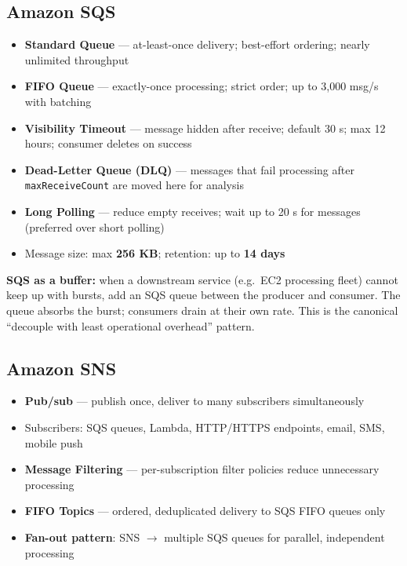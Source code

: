 \subsection{Amazon SQS}

\begin{keyfacts}
\begin{itemize}
  \item \textbf{Standard Queue} --- at-least-once delivery; best-effort ordering; nearly unlimited throughput
  \item \textbf{FIFO Queue} --- exactly-once processing; strict order; up to 3,000 msg/s with batching
  \item \textbf{Visibility Timeout} --- message hidden after receive; default 30 s; max 12 hours; consumer deletes on success
  \item \textbf{Dead-Letter Queue (DLQ)} --- messages that fail processing after \texttt{maxReceiveCount} are moved here for analysis
  \item \textbf{Long Polling} --- reduce empty receives; wait up to 20 s for messages (preferred over short polling)
  \item Message size: max \textbf{256 KB}; retention: up to \textbf{14 days}
\end{itemize}
\end{keyfacts}

\begin{examtip}
\textbf{SQS as a buffer:} when a downstream service (e.g.\ EC2 processing fleet) cannot keep up with bursts, add an SQS queue between the producer and consumer. The queue absorbs the burst; consumers drain at their own rate. This is the canonical ``decouple with least operational overhead'' pattern.
\end{examtip}

\subsection{Amazon SNS}

\begin{keyfacts}
\begin{itemize}
  \item \textbf{Pub/sub} --- publish once, deliver to many subscribers simultaneously
  \item Subscribers: SQS queues, Lambda, HTTP/HTTPS endpoints, email, SMS, mobile push
  \item \textbf{Message Filtering} --- per-subscription filter policies reduce unnecessary processing
  \item \textbf{FIFO Topics} --- ordered, deduplicated delivery to SQS FIFO queues only
  \item \textbf{Fan-out pattern}: SNS $\to$ multiple SQS queues for parallel, independent processing
\end{itemize}
\end{keyfacts}

